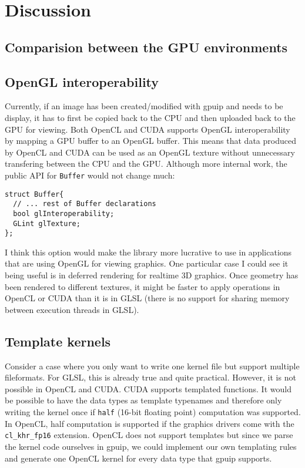 \section{Discussion}
\subsection{Comparision between the GPU environments}


\subsection{OpenGL interoperability}

Currently, if an image has been created/modified with gpuip and needs to be display, it has to first be copied back to the CPU and then uploaded back to the GPU for viewing. Both OpenCL and CUDA supports OpenGL interoperability by mapping a GPU buffer to an OpenGL buffer. This means that data produced by OpenCL and CUDA can be used as an OpenGL texture without unnecessary transfering between the CPU and the GPU. Although more internal work, the public API for {\tt Buffer} would not change much:
\newline
\renewcommand{\lstlistingname}{Code}
\begin{lstlisting}[caption= gpuip OpenGL interoperability, label=glinter]
struct Buffer{
  // ... rest of Buffer declarations 
  bool glInteroperability;
  GLint glTexture;
};
\end{lstlisting}

I think this option would make the library more lucrative to use in applications that are using OpenGL for viewing graphics. One particular case I could see it being useful is in deferred rendering for realtime 3D graphics. Once geometry has been rendered to different textures, it might be faster to apply operations in OpenCL or CUDA than it is in GLSL (there is no support for sharing memory between execution threads in GLSL).

\subsection{Template kernels}

Consider a case where you only want to write one kernel file but support multiple fileformats. For GLSL, this is already true and quite practical. However, it is not possible in OpenCL and CUDA. CUDA supports templated functions. It would be possible to have the data types as template typenames and therefore only writing the kernel once if {\tt half} (16-bit floating point) computation was supported. In OpenCL, half computation is supported if the graphics drivers come with the {\tt cl\_khr\_fp16} extension. OpenCL does not support templates but since we parse the kernel code ourselves in gpuip, we could implement our own templating rules and generate one OpenCL kernel for every data type that gpuip supports. 


